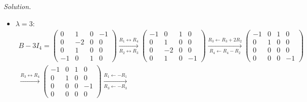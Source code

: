 \documentclass[12pt]{article}
\theoremstyle{definition}
\newenvironment{solution}{\par\noindent\textit{Solution.}\ }{\par\smallskip}
\begin{document}
\begin{solution}
\begin{itemize}
\[\begin{gathered}
\\
\xrightarrow[R_4\leftarrow R_4+R_2]{R_1\leftarrow R_1+R_2,\ R_3\leftarrow R_3+R_2}
\begin{pmatrix}1&0&0&-1\\0&-1&0&0\\0&0&1&0\\0&0&1&0\end{pmatrix}
\xrightarrow{R_4\leftarrow R_4-R_3}
\begin{pmatrix}1&0&0&-1\\0&-1&0&0\\0&0&1&0\\0&0&0&0\end{pmatrix}
\\
\xrightarrow{R_2\leftarrow-R_2}
\begin{pmatrix}1&0&0&-1\\0&1&0&0\\0&0&1&0\\0&0&0&0\end{pmatrix}
\end{gathered}
\]
The special solution \((1,0,0,1)'\) is a basis of \(\mathcal N(B-2I_4)\).
\item \(\lambda=3\):
\[
\begin{gathered}
B-3I_4=\begin{pmatrix}0&1&0&-1\\0&-2&0&0\\0&1&0&0\\-1&0&1&0\end{pmatrix}
\xrightarrow[R_2\leftrightarrow R_3]{R_1\leftrightarrow R_4}
\begin{pmatrix}-1&0&1&0\\0&1&0&0\\0&-2&0&0\\0&1&0&-1\end{pmatrix}
\xrightarrow[R_4\leftarrow R_4-R_2]{R_3\leftarrow R_3+2R_2}
\begin{pmatrix}-1&0&1&0\\0&1&0&0\\0&0&0&0\\0&0&0&-1\end{pmatrix}
\\
\xrightarrow{R_3\leftrightarrow R_4}
\begin{pmatrix}-1&0&1&0\\0&1&0&0\\0&0&0&-1\\0&0&0&0\end{pmatrix}
\xrightarrow[R_3\leftarrow-R_3]{R_1\leftarrow-R_1}

\end{gathered}\]
\end{itemize}
\end{solution}
\end{document}
